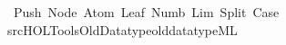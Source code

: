 \begin{isabellebody}
\ {\isacharparenleft}\ Push\ Node\ Atom\ Leaf\ Numb\ Lim\ Split\ Case\isanewline
%
\isadelimML
\isanewline
%
\endisadelimML
%
\isatagML
{}\isamarkupfalse%
\ {\isachardoublequoteopen}{\isachartilde}{\isachartilde}{\isacharslash}src{\isacharslash}HOL{\isacharslash}Tools{\isacharslash}Old{\isacharunderscore}Datatype{\isacharslash}old{\isacharunderscore}datatype{\isachardot}ML{\isachardoublequoteclose}%
\endisatagML
{\isafoldML}%
%
\isadelimML
\isanewline
%
\endisadelimML
%
\isadelimtheory
\isanewline
%
\endisadelimtheory
%
\isatagtheory
{}\isamarkupfalse%
%
\endisatagtheory
{\isafoldtheory}%
%
\isadelimtheory
%
\endisadelimtheory
%
\end{isabellebody}%
\endinput
